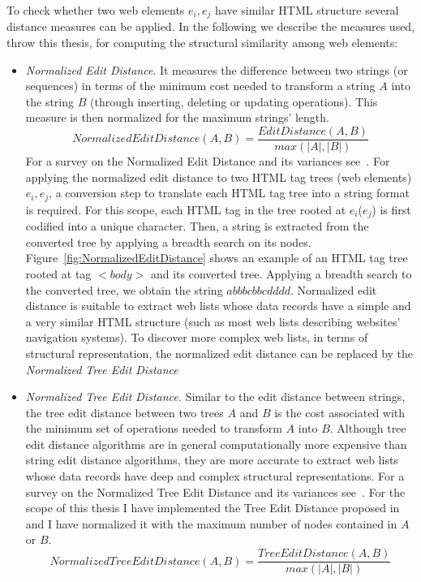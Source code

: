 To check whether two web elements $e_i, e_j$ have similar HTML structure several distance measures can be applied. In the following we describe the measures used, throw this thesis, for computing the structural similarity among web elements:
\begin{itemize}
\item \textit{Normalized Edit Distance}. 
It measures the difference between two strings (or sequences) in terms of the minimum cost needed to transform a string $A$ into the string $B$ (through inserting, deleting or updating operations). This measure is then normalized for the maximum strings' length.
\begin{equation}
NormalizedEditDistance(A,B) = \frac{EditDistance(A,B)}{max(|A|,|B|)}
\end{equation}
For a survey on the Normalized Edit Distance and its variances see~\cite{Yujian:2007}.
For applying the normalized edit distance to two HTML tag trees (web elements) $e_i, e_j$, a conversion step to translate each HTML tag tree into a string format is required. For this scope, each HTML tag in the tree rooted at $e_i$($e_j$) is first codified into a unique character. Then, a string is extracted from the converted tree by applying a breadth search on its nodes. Figure~\ref{fig:NormalizedEditDistance} shows an example of an HTML tag tree rooted at tag $<body>$ and its converted tree. Applying a breadth search to the converted tree, we obtain the string $abbbcbbcdddd$.
Normalized edit distance is suitable to extract web lists whose data records have a simple and a very similar HTML structure (such as most web lists describing websites' navigation systems). To discover more complex web lists, in terms of structural representation, the normalized edit distance can be replaced by the \emph{Normalized Tree Edit Distance}
\item \textit{Normalized Tree Edit Distance.} Similar to the edit distance between strings, the tree edit distance between two trees $A$ and $B$ is the cost associated with the minimum set of operations needed to transform $A$ into $B$. 
Although tree edit distance algorithms are in general computationally more expensive than string edit distance algorithms, they are more accurate to extract web lists whose data records have deep and complex structural representations. %
For a survey on the Normalized Tree Edit Distance and its variances see~\cite{Demaine:2009}. For the scope of this thesis I have implemented the Tree Edit Distance proposed in \cite{Zhai:2005} and I have normalized it with the maximum number of nodes contained in $A$ or $B$.
\begin{equation}
NormalizedTreeEditDistance(A,B) = \frac{TreeEditDistance(A,B)}{max(|A|,|B|)}
\end{equation}
\end{itemize}

